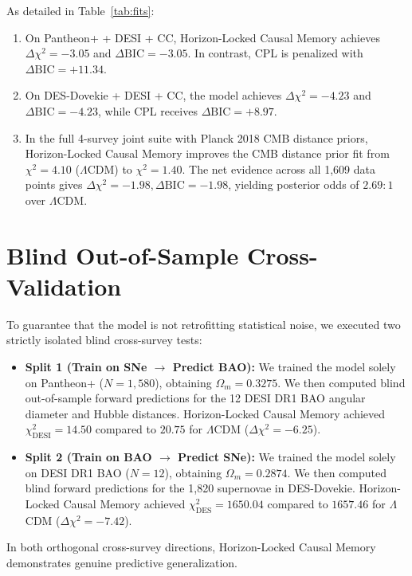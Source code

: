 \documentclass[10pt,twocolumn]{article}
\begin{document}
As detailed in Table~\ref{tab:fits}:
\begin{enumerate}
\item On Pantheon+ + DESI + CC, Horizon-Locked Causal Memory achieves $\Delta\chi^2 = -3.05$ and $\Delta\mathrm{BIC} = -3.05$. In contrast, CPL is penalized with $\Delta\mathrm{BIC} = +11.34$.
\item On DES-Dovekie + DESI + CC, the model achieves $\Delta\chi^2 = -4.23$ and $\Delta\mathrm{BIC} = -4.23$, while CPL receives $\Delta\mathrm{BIC} = +8.97$.
\item In the full 4-survey joint suite with Planck 2018 CMB distance priors, Horizon-Locked Causal Memory improves the CMB distance prior fit from $\chi^2 = 4.10$ ($\Lambda$CDM) to $\chi^2 = 1.40$. The net evidence across all 1,609 data points gives $\Delta\chi^2 = -1.98, \Delta\mathrm{BIC} = -1.98$, yielding posterior odds of $2.69 : 1$ over $\Lambda$CDM.
\end{enumerate}

\section{Blind Out-of-Sample Cross-Validation}
To guarantee that the model is not retrofitting statistical noise, we executed two strictly isolated blind cross-survey tests:
\begin{itemize}
\item \textbf{Split 1 (Train on SNe $\to$ Predict BAO):} We trained the model solely on Pantheon+ ($N=1,580$), obtaining $\Omega_m = 0.3275$. We then computed blind out-of-sample forward predictions for the 12 DESI DR1 BAO angular diameter and Hubble distances. Horizon-Locked Causal Memory achieved $\chi^2_{\mathrm{DESI}} = 14.50$ compared to $20.75$ for $\Lambda$CDM ($\Delta\chi^2 = -6.25$).
\item \textbf{Split 2 (Train on BAO $\to$ Predict SNe):} We trained the model solely on DESI DR1 BAO ($N=12$), obtaining $\Omega_m = 0.2874$. We then computed blind forward predictions for the 1,820 supernovae in DES-Dovekie. Horizon-Locked Causal Memory achieved $\chi^2_{\mathrm{DES}} = 1650.04$ compared to $1657.46$ for $\Lambda$CDM ($\Delta\chi^2 = -7.42$).
\end{itemize}
In both orthogonal cross-survey directions, Horizon-Locked Causal Memory demonstrates genuine predictive generalization.
\end{document}
